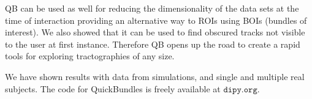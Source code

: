 \documentclass[journal]{IEEEtran}
\begin{document}
QB can be used as well for reducing the dimensionality of the data sets
at the time of interaction providing an alternative way to ROIs using
BOIs (bundles of interest). We also showed
that it can be used to find obscured tracks not visible to the user
at first instance. Therefore QB opens up the road to create a rapid
tools for exploring tractographies of any size.

We have shown results with data from simulations, and single and
multiple real subjects. The code for QuickBundles is freely available at
$\texttt{dipy.org}$.


%

%
%


\appendices
{}



\end{document}
